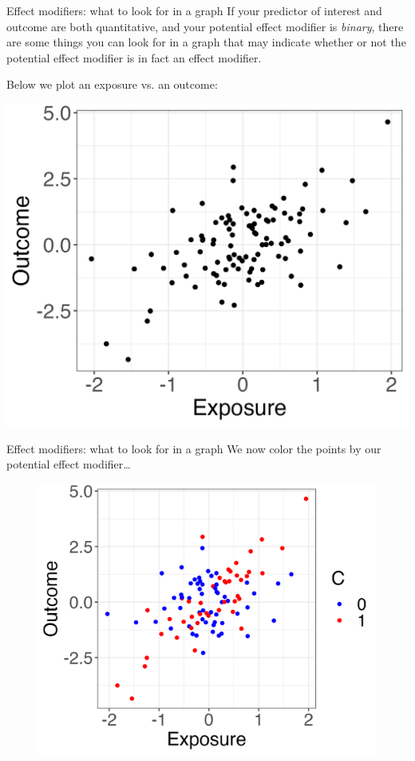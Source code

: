 \documentclass[10pt,t]{beamer}
\begin{document}
\begin{frame}{Effect modifiers: what to look for in a graph}
If your predictor of interest and outcome are both quantitative, and your potential effect modifier is \textit{binary}, there are some things you can look for in a graph that may indicate whether or not the potential effect modifier is in fact an effect modifier. \pause

\vspace{0.3cm}

Below we plot an exposure vs. an outcome:

\vspace{0.3cm}

\centering \includegraphics[scale=0.4]{p2.png}
\end{frame}

\begin{frame}{Effect modifiers: what to look for in a graph}
We now color the points by our potential effect modifier\dots
\vspace{0.3cm}

\begin{figure}
	\centering \includegraphics[scale=0.4]{p3.png}
\end{figure}

\end{frame}
\end{document}
